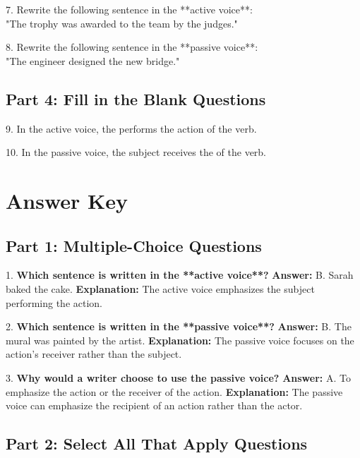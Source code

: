 \documentclass[12pt]{article}
\begin{document}
7. Rewrite the following sentence in the **active voice**: \\  
"The trophy was awarded to the team by the judges."  
\vspace{4cm}

8. Rewrite the following sentence in the **passive voice**: \\  
"The engineer designed the new bridge."  
\vspace{4cm}

\subsection*{Part 4: Fill in the Blank Questions}
\vspace{1cm}
9. In the active voice, the \underline{\hspace{4cm}} performs the action of the verb.  
\vspace{2cm}

10. In the passive voice, the subject receives the \underline{\hspace{4cm}} of the verb.  
\vspace{2cm}
\newpage
\section*{Answer Key}

\subsection*{Part 1: Multiple-Choice Questions}

1. \textbf{Which sentence is written in the **active voice**?}  
\textbf{Answer:} B. Sarah baked the cake.  
\textbf{Explanation:} The active voice emphasizes the subject performing the action.

\vspace{1cm}
2. \textbf{Which sentence is written in the **passive voice**?}  
\textbf{Answer:} B. The mural was painted by the artist.  
\textbf{Explanation:} The passive voice focuses on the action's receiver rather than the subject.

\vspace{1cm}
3. \textbf{Why would a writer choose to use the passive voice?}  
\textbf{Answer:} A. To emphasize the action or the receiver of the action.  
\textbf{Explanation:} The passive voice can emphasize the recipient of an action rather than the actor.

\subsection*{Part 2: Select All That Apply Questions}
\end{document}
